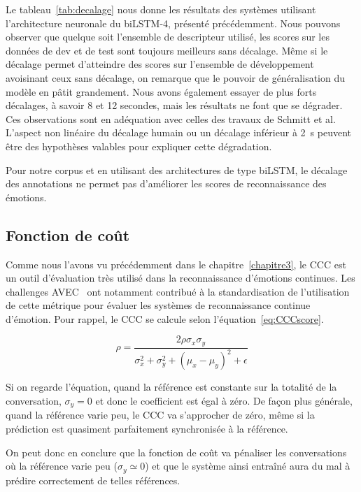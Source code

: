 Le tableau~\ref{tab:decalage} nous donne les résultats des systèmes utilisant l'architecture neuronale du biLSTM-4, présenté précédemment. Nous pouvons observer que quelque soit l'ensemble de descripteur utilisé, les scores sur les données de dev et de test sont toujours meilleurs sans décalage. Même si le décalage permet d'atteindre des scores sur l'ensemble de développement avoisinant ceux sans décalage, on remarque que le pouvoir de généralisation du modèle en pâtit grandement. Nous avons également essayer de plus forts décalages, à savoir 8 et 12 secondes, mais les résultats ne font que se dégrader. Ces observations sont en adéquation avec celles des travaux de Schmitt et al. L'aspect non linéaire du décalage humain ou un décalage inférieur à 2~s peuvent être des hypothèses valables pour expliquer cette dégradation.

Pour notre corpus et en utilisant des architectures de type biLSTM, le décalage des annotations ne permet pas d'améliorer les scores de reconnaissance des émotions.

\subsection{Fonction de coût}
Comme nous l'avons vu précédemment dans le chapitre~\ref{chapitre3}, le CCC est un outil d'évaluation très utilisé dans la reconnaissance d'émotions continues. Les challenges AVEC~\cite{AVEC2018} ont notamment contribué à la standardisation de l'utilisation de cette métrique pour évaluer les systèmes de reconnaissance continue d'émotion. Pour rappel, le CCC se calcule selon l'équation~\ref{eq:CCCscore}.

\begin{equation}
   \rho = \frac{2\rho\sigma_x\sigma_y}{\sigma_x^2 + \sigma_y^2 + (\mu_x - \mu_y)^2 + \epsilon}
\label{eq:CCCscore}
\end{equation}

Si on regarde l'équation, quand la référence est constante sur la totalité de la conversation, $\sigma_y = 0$ et donc le coefficient est égal à zéro. De façon plus générale, quand la référence varie peu, le CCC va s'approcher de zéro, même si la prédiction est quasiment parfaitement synchronisée à la référence.

On peut donc en conclure que la fonction de coût va pénaliser les conversations où la référence varie peu ($\sigma_y \simeq 0$) et que le système ainsi entraîné aura du mal à prédire correctement de telles références.



